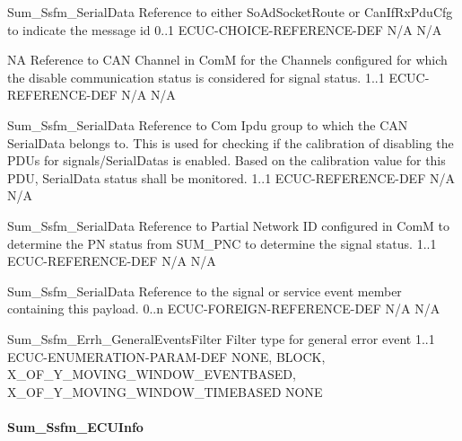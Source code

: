 
{Sum_Ssfm_SerialData}
{Reference to either SoAdSocketRoute or CanIfRxPduCfg to indicate the message id}
{0..1}
{ECUC-CHOICE-REFERENCE-DEF}
{N/A}
{N/A}


{NA}
{Reference to CAN Channel in ComM for the Channels configured for which the disable communication status is considered for signal status.}
{1..1}
{ECUC-REFERENCE-DEF}
{N/A}
{N/A}



{Sum_Ssfm_SerialData}
{Reference to Com Ipdu group to which the CAN SerialData belongs to. This is used for checking if the calibration of disabling the PDUs for signals/SerialDatas is enabled. Based on the calibration value for this PDU, SerialData status shall be monitored.}
{1..1}
{ECUC-REFERENCE-DEF}
{N/A}
{N/A}

{  }


{Sum_Ssfm_SerialData}
{Reference to Partial Network ID configured in ComM to determine the PN status from SUM_PNC to determine the signal status.}
{1..1}
{ECUC-REFERENCE-DEF}
{N/A}
{N/A}



{Sum_Ssfm_SerialData}
{Reference to the signal or service event member containing this payload.}
{0..n}
{ECUC-FOREIGN-REFERENCE-DEF}
{N/A}
{N/A}



{Sum_Ssfm_Errh_GeneralEventsFilter}
{Filter type for general error event}
{1..1}
{ECUC-ENUMERATION-PARAM-DEF}
{NONE, BLOCK, X_OF_Y_MOVING_WINDOW_EVENTBASED, X_OF_Y_MOVING_WINDOW_TIMEBASED}
{NONE}


{  }

\paragraph{Sum_Ssfm_ECUInfo}

